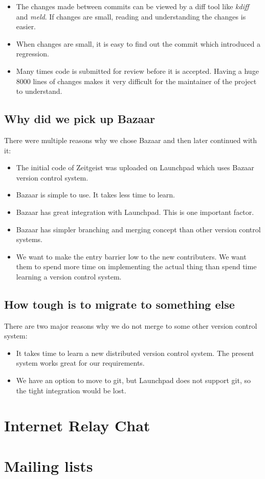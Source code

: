 \begin{itemize}
\item The changes made between commits can be viewed by a diff tool like \textit{kdiff} and \textit{meld}. 
If changes are small, reading and understanding the changes is easier.
\item When changes are small, it is easy to find out the commit which introduced a regression.
\item Many times code is submitted for review before it is accepted. Having a huge 8000 lines 
of changes makes it very difficult for the maintainer of the project to understand.
\end{itemize}

\subsection{Why did we pick up Bazaar}
There were multiple reasons why we chose Bazaar and then later continued with it: 
\begin{itemize}
\item The initial code of Zeitgeist was uploaded on Launchpad which uses Bazaar version control system.
\item Bazaar is simple to use. It takes less time to learn.
\item Bazaar has great integration with Launchpad. This is one important factor.
\item Bazaar has simpler branching and merging concept than other version control systems.
\item We want to make the entry barrier low to the new contributers. We want them to spend more time 
on implementing the actual thing than spend time learning a version control system.
\end{itemize}

\subsection{How tough is to migrate to something else}
There are two major reasons why we do not merge to some other version control system: 
\begin{itemize}
\item It takes time to learn a new distributed version control system. The present system works 
great for our requirements.
\item We have an option to move to git, but Launchpad does not support git, so the tight 
integration would be lost.
\end{itemize}
\section{Internet Relay Chat}
\section{Mailing lists}